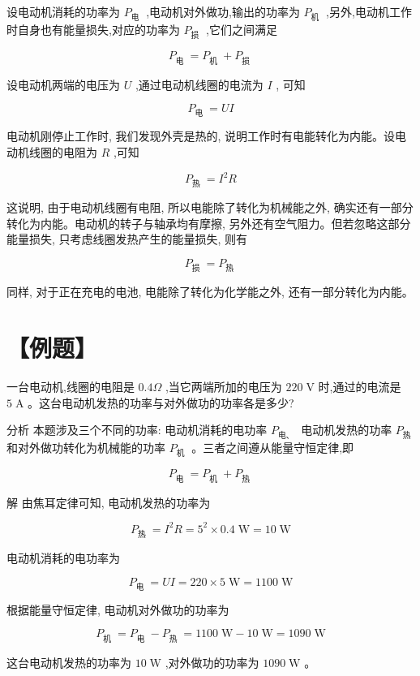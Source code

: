 \documentclass[10pt]{article}
\begin{document}
设电动机消耗的功率为 \({P}_{\text{电 }}\) ,电动机对外做功,输出的功率为 \({P}_{\text{机 }}\) ,另外,电动机工作时自身也有能量损失,对应的功率为 \({P}_{\text{损 }}\) ,它们之间满足

\[
{P}_{\text{电 }} = {P}_{\text{机 }} + {P}_{\text{损 }}
\]

设电动机两端的电压为 \(U\) ,通过电动机线圈的电流为 \(I\) , 可知

\[
{P}_{\text{电 }} = {UI}
\]

电动机刚停止工作时, 我们发现外壳是热的, 说明工作时有电能转化为内能。设电动机线圈的电阻为 \(R\) ,可知

\[
{P}_{\text{热 }} = {I}^{2}R
\]

这说明, 由于电动机线圈有电阻, 所以电能除了转化为机械能之外, 确实还有一部分转化为内能。电动机的转子与轴承均有摩擦, 另外还有空气阻力。但若忽略这部分能量损失, 只考虑线圈发热产生的能量损失, 则有

\[
{P}_{\text{损 }} = {P}_{\text{热 }}
\]

同样, 对于正在充电的电池, 电能除了转化为化学能之外, 还有一部分转化为内能。

\section*{【例题】}

一台电动机,线圈的电阻是 \({0.4\Omega }\) ,当它两端所加的电压为 \({220}\mathrm{\;V}\) 时,通过的电流是 \(5\mathrm{\;A}\) 。这台电动机发热的功率与对外做功的功率各是多少?

分析 本题涉及三个不同的功率: 电动机消耗的电功率 \({P}_{\text{电、 }}\) 电动机发热的功率 \({P}_{\text{热 }}\) 和对外做功转化为机械能的功率 \({P}_{\text{机 }}\) 。三者之间遵从能量守恒定律,即

\[
{P}_{\text{电 }} = {P}_{\text{机 }} + {P}_{\text{热 }}
\]

解 由焦耳定律可知, 电动机发热的功率为

\[
{P}_{\text{热 }} = {I}^{2}R = {5}^{2} \times {0.4}\mathrm{\;W} = {10}\mathrm{\;W}
\]

电动机消耗的电功率为

\[
{P}_{\text{电 }} = {UI} = {220} \times 5\mathrm{\;W} = {1100}\mathrm{\;W}
\]

根据能量守恒定律, 电动机对外做功的功率为

\[
{P}_{\text{机 }} = {P}_{\text{电 }} - {P}_{\text{热 }} = {1100}\mathrm{\;W} - {10}\mathrm{\;W} = {1090}\mathrm{\;W}
\]

这台电动机发热的功率为 \({10}\mathrm{\;W}\) ,对外做功的功率为 \({1090}\mathrm{\;W}\) 。
\end{document}
